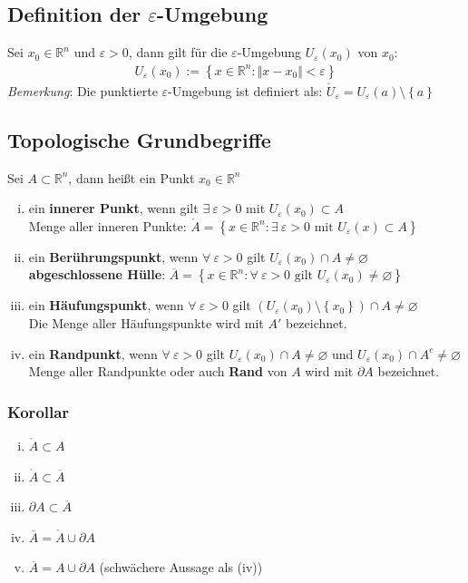 \documentclass[11pt,a4paper]{book}
\newcommand {\Rn}	{\mathbb{R}^n}
\newcommand{\1}    	{\mathbbm{1}}
\newcommand{\Bemerkung}	{\noindent\textit{Bemerkung}: }
\begin{document}
\subsection{Definition der \(\varepsilon\)-Umgebung}
Sei \(x_0 \in \Rn\) und \(\varepsilon > 0\), dann gilt für die \(\varepsilon\)-Umgebung \(U_\varepsilon(x_0)\) von \(x_0\):
\begin{align*}
	U_\varepsilon(x_0) := \left\{ x \in \Rn : \Vert x - x_0 \Vert < \varepsilon \right\}
\end{align*}
\Bemerkung Die punktierte \(\varepsilon\)-Umgebung ist definiert als: \( \dot{U}_\varepsilon = U_\varepsilon (a) \setminus \left\{ a \right\} \)

\subsection{Topologische Grundbegriffe}
Sei \(A \subset \Rn\), dann heißt ein Punkt \(x_0 \in \Rn\)
\begin{enumerate}[(i)]
	\item ein \textbf{innerer Punkt}, wenn gilt \(\exists~ \varepsilon > 0\) mit \(U_\varepsilon(x_0) \subset A\) \\
	Menge aller inneren Punkte: \( \mathring{A} = \left\{ x \in \Rn : \exists~ \varepsilon > 0 \textrm{ mit } U_\varepsilon(x) \subset A \right\} \)
	\item ein \textbf{Berührungspunkt}, wenn \(\forall~ \varepsilon > 0\) gilt \(U_\varepsilon (x_0) \cap A \neq \varnothing \) \\
	\textbf{abgeschlossene Hülle}: \(\overline{A} = \left\{ x \in \Rn : \forall~ \varepsilon > 0 \textrm{ gilt } U_\varepsilon(x_0) \neq \varnothing \right\} \)
	\item ein \textbf{Häufungspunkt}, wenn \(\forall~ \varepsilon > 0\) gilt \( \left( U_\varepsilon(x_0) \setminus \left\{ x_0 \right\} \right) \cap A \neq \varnothing \) \\
	Die Menge aller Häufungspunkte wird mit \(A'\) bezeichnet.
	\item ein \textbf{Randpunkt}, wenn \(\forall~ \varepsilon > 0\) gilt \( U_\varepsilon(x_0) \cap A \neq \varnothing\) und \( U_\varepsilon(x_0) \cap A^c \neq \varnothing\) \\
	Menge aller Randpunkte oder auch \textbf{Rand} von \(A\) wird mit \(\partial A \) bezeichnet.
\end{enumerate}
\subsubsection*{Korollar}
\begin{enumerate}[(i)]
	\item \(\mathring{A} \subset A\)
	\item \(\mathring{A} \subset \overline{A}\)
	\item \(\partial A \subset \overline{A}\)
	\item \(\overline{A} = \mathring{A} \cup \partial A \)
	\item \(\overline{A} = A \cup \partial A \) (schwächere Aussage als (iv))
\end{enumerate}
\end{document}
